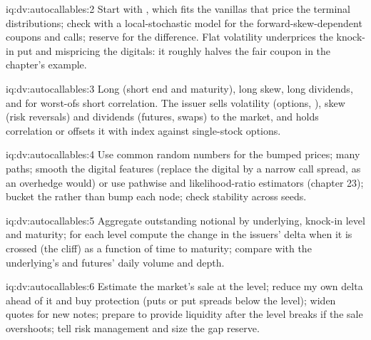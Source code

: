 \begin{solution}{iq:dv:autocallables:2}
Start with , which fits the vanillas that price the terminal distributions; check with a local-stochastic model for the
forward-skew-dependent coupons and calls; reserve for the difference. Flat volatility underprices the knock-in put and mispricing the
digitals: it roughly halves the fair coupon in the chapter's example.
\end{solution}

\begin{solution}{iq:dv:autocallables:3}
Long  (short end and maturity), long skew, long dividends, and for worst-ofs short correlation. The issuer sells volatility (options,
), skew (risk reversals) and dividends (futures, swaps) to the market, and holds correlation or offsets it with index against
single-stock options.
\end{solution}

\begin{solution}{iq:dv:autocallables:4}
Use common random numbers for the bumped prices; many paths; smooth the digital features (replace the digital by a narrow call spread, as an
overhedge would) or use pathwise and likelihood-ratio estimators (chapter 23); bucket the  rather than bump each node; check stability
across seeds.
\end{solution}

\begin{solution}{iq:dv:autocallables:5}
Aggregate outstanding notional by underlying, knock-in level and maturity; for each level compute the change in the issuers' delta when it is
crossed (the cliff) as a function of time to maturity; compare with the underlying's and futures' daily volume and depth.
\end{solution}

\begin{solution}{iq:dv:autocallables:6}
Estimate the market's sale at the level; reduce my own delta ahead of it and buy protection (puts or put spreads below the level); widen quotes
for new notes; prepare to provide liquidity after the level breaks if the sale overshoots; tell risk management and size the gap reserve.
\end{solution}
